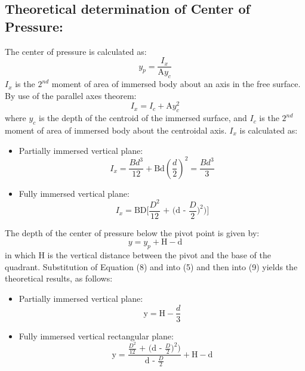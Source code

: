 \documentclass[12pt,a4paper]{article}
\begin{document}
\subsection{Theoretical determination of Center of Pressure:}
The center of pressure  is calculated as:
\begin{equation}
	\text{$y_p$} = \frac{\text{$I_x$}}{\text{A$y_c$}}
\end{equation}
$I_x$ is the $2^{nd}$ moment of area of immersed body about an axis in the free surface. By use of the parallel axes theorem:
\begin{equation}
	\text{$I_x$} = \text{$I_c$} + \text{A$y_c^2$}
\end{equation}
where $y_c$ is the depth of the centroid of the immersed surface, and $I_c$ is the $2^{nd}$ moment of area of immersed body about the centroidal axis. $I_x$  is calculated as:
\begin{itemize}
\item Partially immersed vertical plane:
\begin{equation}
	\text{$I_x$} = \frac{Bd^3}{12} + \text{Bd$(\frac{d}{2})^2$} = \frac{Bd^3}{3}
\end{equation}
\item Fully immersed vertical plane:
\begin{equation}
	\text{$I_x$} = \text{BD[$\frac{D^2}{12}$ + (d - $\frac{D}{2})^2$)]}
\end{equation}
\end{itemize}
The depth of the center of pressure below the pivot point is given by:
\begin{equation}
	\text{$y$} = \text{$y_p$} + \text{H} - \text{d}
\end{equation}
in which H is the vertical distance between the pivot and the base of the quadrant. Substitution of Equation (8) and into (5) and then into (9) yields the theoretical results, as follows:
\begin{itemize}
\item Partially immersed vertical plane:
\begin{equation}
	\text{y} = \text{H} - \frac{d}{3}
\end{equation}
\item Fully immersed vertical rectangular plane:
\begin{equation}
	\text{y} = \frac{\text{$\frac{D^2}{12}$ + (d - $\frac{D}{2})^2$)}}{\text{d - $\frac{D}{2}$}} + \text{H} - \text{d} 
\end{equation}
\end{itemize}
\end{document}
